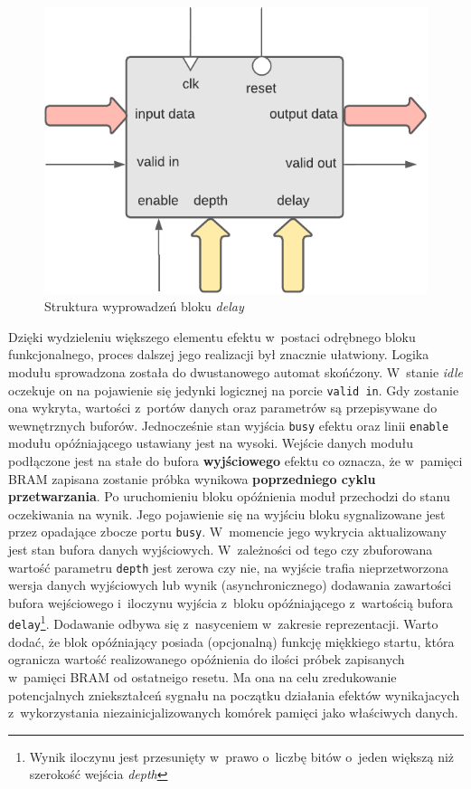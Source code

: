 \vspace{0.5cm}
\begin{figure}[ht]
    \centering
    \includegraphics[scale=0.75]{img/diagrams/delay.pdf}
    \captionsetup{format=plain,justification=centering}
    \caption{Struktura wyprowadzeń bloku \textit{delay}}
    \label{delay-structure}
\end{figure}
\vspace{0.5cm}

Dzięki wydzieleniu większego elementu efektu w~postaci odrębnego bloku funkcjonalnego, proces dalszej jego realizacji był znacznie ułatwiony. Logika modułu sprowadzona została do dwustanowego automat skońćzony. W~stanie \textit{idle} oczekuje on na pojawienie się jedynki logicznej na porcie \verb|valid in|. Gdy zostanie ona wykryta, wartości z~portów danych oraz parametrów są przepisywane do wewnętrznych buforów. Jednocześnie stan wyjścia \verb|busy| efektu oraz linii \verb|enable| modułu opóźniającego ustawiany jest na wysoki. Wejście danych modułu podłączone jest na stałe do bufora \textbf{wyjściowego} efektu co oznacza, że w~pamięci BRAM zapisana zostanie próbka wynikowa \textbf{poprzedniego cyklu przetwarzania}. Po uruchomieniu bloku opóźnienia moduł przechodzi do stanu oczekiwania na wynik. Jego pojawienie się na wyjściu bloku sygnalizowane jest przez opadające zbocze portu \verb|busy|. W~momencie jego wykrycia aktualizowany jest stan bufora danych wyjściowych. W~zależności od tego czy zbuforowana wartość parametru \verb|depth| jest zerowa czy nie, na wyjście trafia nieprzetworzona wersja danych wyjściowych lub wynik (asynchronicznego) dodawania zawartości bufora wejściowego i~iloczynu wyjścia z~bloku opóźniającego z~wartością bufora \verb|delay|\footnote{Wynik iloczynu jest przesunięty w~prawo o~liczbę bitów o~jeden większą niż szerokość wejścia \textit{depth}}. Dodawanie odbywa się z~nasyceniem w~zakresie reprezentacji. Warto dodać, że blok opóźniający posiada (opcjonalną) funkcję miękkiego startu, która ogranicza wartość realizowanego opóźnienia do ilości próbek zapisanych w~pamięci BRAM od ostatneigo resetu. Ma ona na celu zredukowanie potencjalnych zniekształceń sygnału na początku działania efektów wynikajacych z~wykorzystania niezainicjalizowanych komórek pamięci jako właściwych danych.

